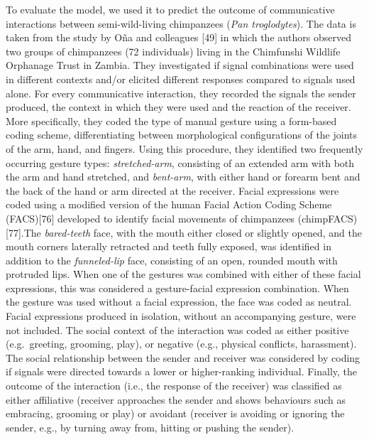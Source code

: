 \documentclass[
  man,floatsintext]{apa6}
\begin{document}
To evaluate the model, we used it to predict the outcome of communicative interactions between semi-wild-living chimpanzees (\emph{Pan troglodytes}). The data is taken from the study by Oña and colleagues {[}49{]} in which the authors observed two groups of chimpanzees (72 individuals) living in the Chimfunshi Wildlife Orphanage Trust in Zambia. They investigated if signal combinations were used in different contexts and/or elicited different responses compared to signals used alone. For every communicative interaction, they recorded the signals the sender produced, the context in which they were used and the reaction of the receiver. More specifically, they coded the type of manual gesture using a form-based coding scheme, differentiating between morphological configurations of the joints of the arm, hand, and fingers. Using this procedure, they identified two frequently occurring gesture types: \emph{stretched-arm}, consisting of an extended arm with both the arm and hand stretched, and \emph{bent-arm}, with either hand or forearm bent and the back of the hand or arm directed at the receiver. Facial expressions were coded using a modified version of the human Facial Action Coding Scheme (FACS){[}76{]} developed to identify facial movements of chimpanzees (chimpFACS){[}77{]}.The \emph{bared-teeth} face, with the mouth either closed or slightly opened, and the mouth corners laterally retracted and teeth fully exposed, was identified in addition to the \emph{funneled-lip} face, consisting of an open, rounded mouth with protruded lips. When one of the gestures was combined with either of these facial expressions, this was considered a gesture-facial expression combination. When the gesture was used without a facial expression, the face was coded as neutral. Facial expressions produced in isolation, without an accompanying gesture, were not included. The social context of the interaction was coded as either positive (e.g.~greeting, grooming, play), or negative (e.g., physical conflicts, harassment). The social relationship between the sender and receiver was considered by coding if signals were directed towards a lower or higher-ranking individual. Finally, the outcome of the interaction (i.e., the response of the receiver) was classified as either affiliative (receiver approaches the sender and shows behaviours such as embracing, grooming or play) or avoidant (receiver is avoiding or ignoring the sender, e.g., by turning away from, hitting or pushing the sender).
\end{document}
